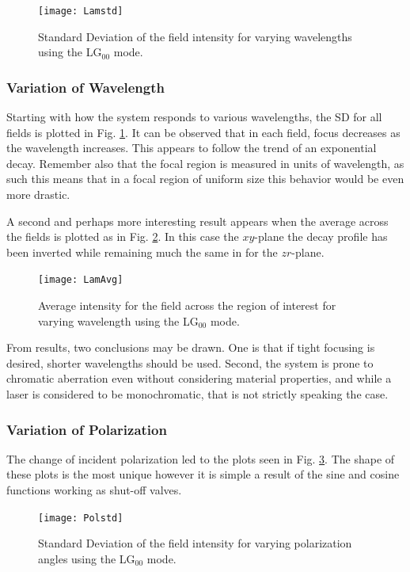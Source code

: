 \documentclass[12pt,a4paper]{article}
\begin{document}
\begin{figure}[ht]
\centering\texttt{[image: Lamstd]}
\caption{Standard Deviation of the field intensity for varying wavelengths using the LG$_{00}$ mode.}
\label{Lamstd}
\end{figure}

\subsubsection{Variation of Wavelength}
\label{VarLamRes}
Starting with how the system responds to various wavelengths, the SD for all fields is plotted in Fig. \ref{Lamstd}. It can be observed that in each field, focus decreases as the wavelength increases. This appears to follow the trend of an exponential decay. Remember also that the focal region is measured in units of wavelength, as such this means that in a focal region of uniform size this behavior would be even more drastic.

A second and perhaps more interesting result appears when the average across the fields is plotted as in Fig. \ref{LamAvg}. In this case the $xy$-plane the decay profile has been inverted while remaining much the same in for the $zr$-plane.

\begin{figure}[ht]
\centering\texttt{[image: LamAvg]}
\caption{Average intensity for the field across the region of interest for varying wavelength using the LG$_{00}$ mode.}
\label{LamAvg}
\end{figure}

From results, two conclusions may be drawn. One is that if tight focusing is desired, shorter wavelengths should be used. Second, the system is prone to chromatic aberration even without considering material properties, and while a laser is considered to be monochromatic, that is not strictly speaking the case. 

\subsubsection{Variation of Polarization}
The change of incident polarization led to the plots seen in Fig. \ref{Polstd}. The shape of these plots is the most unique however it is simple a result of the sine and cosine functions working as shut-off valves.

\begin{figure}[ht]
\centering\texttt{[image: Polstd]}
\caption{Standard Deviation of the field intensity for varying polarization angles using the LG$_{00}$ mode.}
\label{Polstd}
\end{figure}
\end{document}
